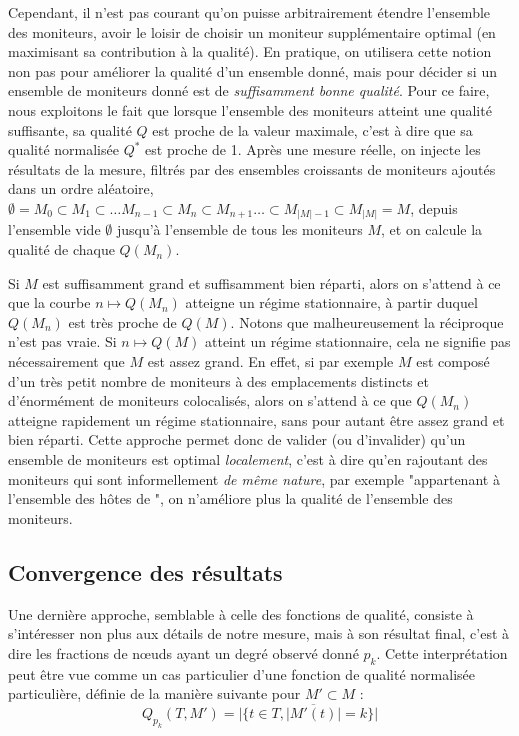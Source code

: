 Cependant, il n'est pas courant qu'on puisse arbitrairement étendre l'ensemble
des moniteurs, \afortiori avoir le loisir de choisir un moniteur supplémentaire
optimal (en maximisant sa contribution à la qualité). En pratique, on utilisera
cette notion non pas pour améliorer la qualité d'un ensemble donné, mais pour
décider si un ensemble de moniteurs donné est de \emph{suffisamment bonne
qualité}. Pour ce faire, nous exploitons le fait que lorsque l'ensemble des
moniteurs atteint une qualité suffisante, sa qualité $Q$ est proche de la valeur
maximale, c'est à dire que sa qualité normalisée $Q^*$ est proche de 1. Après
une mesure réelle, on injecte les résultats de la mesure, filtrés par des
ensembles croissants de moniteurs ajoutés dans un ordre aléatoire, $\emptyset =
M_0 \subset M_1 \subset \ldots M_{n-1} \subset M_n \subset M_{n+1} \ldots
\subset M_{|M| - 1} \subset M_{|M|} = M$, depuis l'ensemble vide $\emptyset$
jusqu'à l'ensemble de tous les moniteurs $M$, et on calcule la qualité de chaque
$Q(M_n)$.

Si $M$ est suffisamment grand et suffisamment bien réparti, alors on s'attend à
ce que la courbe $n \mapsto Q(M_n)$ atteigne un régime stationnaire, à partir
duquel $Q(M_n)$ est très proche de $Q(M)$. Notons que malheureusement la
réciproque n'est pas vraie. Si $n \mapsto Q(M)$ atteint un régime stationnaire,
cela ne signifie pas nécessairement que $M$ est assez grand. En effet, si par
exemple $M$ est composé d'un très petit nombre de moniteurs à des emplacements
distincts et d'énormément de moniteurs colocalisés, alors on s'attend à ce que
$Q(M_n)$ atteigne rapidement un régime stationnaire, sans pour autant être assez
grand et bien réparti. Cette approche permet donc de valider (ou d'invalider)
qu'un ensemble de moniteurs est optimal \emph{localement}, c'est à dire qu'en
rajoutant des moniteurs qui sont informellement \emph{de même nature}, par
exemple "appartenant à l'ensemble des hôtes de \planetlab", on n'améliore plus la
qualité de l'ensemble des moniteurs.

\subsection{Convergence des résultats}
\label{subsec:udpping-monitors-convergence}

Une dernière approche, semblable à celle des fonctions de qualité, consiste à
s'intéresser non plus aux détails de notre mesure, mais à son résultat final,
c'est à dire les fractions de n\oe{}uds ayant un degré observé donné $p_k$. Cette
interprétation peut être vue comme un cas particulier d'une fonction de qualité
normalisée particulière, définie de la manière suivante pour $M' \subset M$ :
$$Q_{p_k}(T, M') = |\{ t \in T, |\overline{M'(t)}| = k \}|$$

